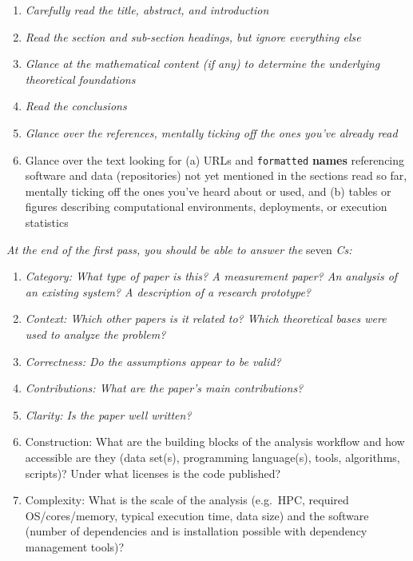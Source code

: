 \documentclass[fleqn,10pt]{wlpeerj} %
\providecommand{\tightlist}{
\setlength{\itemsep}{0pt}\setlength{\parskip}{0pt}}
\begin{document}
\begin{enumerate}
\def\labelenumi{\arabic{enumi}.}
\tightlist
\item
  \emph{Carefully read the title, abstract, and introduction}
\item
  \emph{Read the section and sub-section headings, but ignore everything
  else}
\item
  \emph{Glance at the mathematical content (if any) to determine the
  underlying theoretical foundations}
\item
  \emph{Read the conclusions}
\item
  \emph{Glance over the references, mentally ticking off the ones you've
  already read}
\item
  Glance over the text looking for (a) URLs and \texttt{formatted}
  \textbf{names} referencing software and data (repositories) not yet
  mentioned in the sections read so far, mentally ticking off the ones
  you've heard about or used, and (b) tables or figures describing
  computational environments, deployments, or execution statistics
\end{enumerate}

\emph{At the end of the first pass, you should be able to answer the}
seven \emph{Cs:}

\begin{enumerate}
\def\labelenumi{\arabic{enumi}.}
\tightlist
\item
  \emph{Category: What type of paper is this? A measurement paper? An
  analysis of an existing system? A description of a research
  prototype?}
\item
  \emph{Context: Which other papers is it related to? Which theoretical
  bases were used to analyze the problem?}
\item
  \emph{Correctness: Do the assumptions appear to be valid?}
\item
  \emph{Contributions: What are the paper's main contributions?}
\item
  \emph{Clarity: Is the paper well written?}
\item
  Construction: What are the building blocks of the analysis workflow
  and how accessible are they (data set(s), programming language(s),
  tools, algorithms, scripts)? Under what licenses is the code
  published?
\item
  Complexity: What is the scale of the analysis (e.g.~HPC, required
  OS/cores/memory, typical execution time, data size) and the software
  (number of dependencies and is installation possible with dependency
  management tools)?
\end{enumerate}
\end{document}
